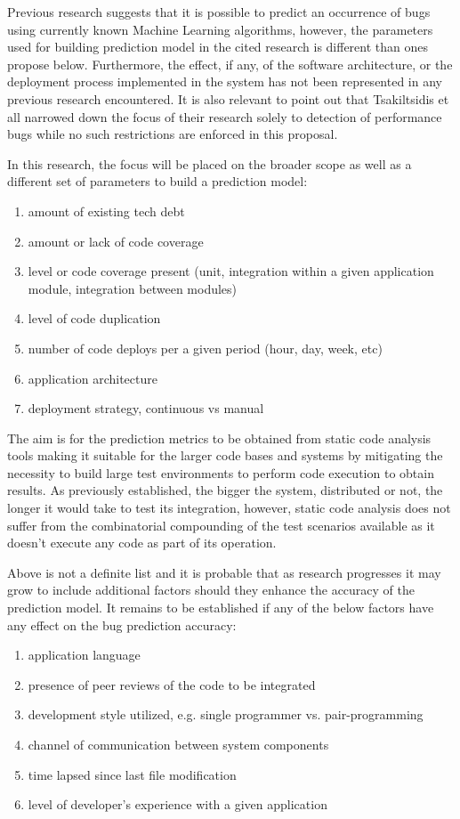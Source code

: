 Previous research suggests that it is possible to predict an occurrence of bugs using currently known Machine Learning algorithms\cite{autoDetectionOfPerfBugs}, however, the parameters used for building prediction model in the cited research is different than ones propose below. Furthermore, the effect, if any, of the software architecture, or the deployment process implemented in the system has not been represented in any previous research encountered. It is also relevant to point out that Tsakiltsidis et all\cite{autoDetectionOfPerfBugs} narrowed down the focus of their research solely to detection of performance bugs while no such restrictions are enforced in this proposal.

In this research, the focus will be placed on the broader scope as well as a different set of parameters to build a prediction model: 
\begin{enumerate}
\item amount of existing tech debt
\item amount or lack of code coverage
\item level or code coverage present (unit, integration within a given application module, integration between modules)
\item level of code duplication
\item number of code deploys per a given period (hour, day, week, etc)
\item application architecture
\item deployment strategy, continuous vs manual
\end{enumerate}
The aim is for the prediction metrics to be obtained from static code analysis tools making it suitable for the larger code bases and systems by mitigating the necessity to build large test environments to perform code execution to obtain results. As previously established, the bigger the system, distributed or not, the longer it would take to test its integration, however, static code analysis does not suffer from the combinatorial compounding of the test scenarios available as it doesn't execute any code as part of its operation.

Above is not a definite list and it is probable that as research progresses it may grow to include additional factors should they enhance the accuracy of the prediction model. It remains to be established if any of the below factors have any effect on the bug prediction accuracy:
\begin{enumerate}
\item application language
\item presence of peer reviews of the code to be integrated
\item development style utilized, e.g. single programmer vs. pair-programming
\item channel of communication between system components
\item \label{fileAge} time lapsed since last file modification
\item \label{developerMastery}level of developer's experience with a given application
\end{enumerate}